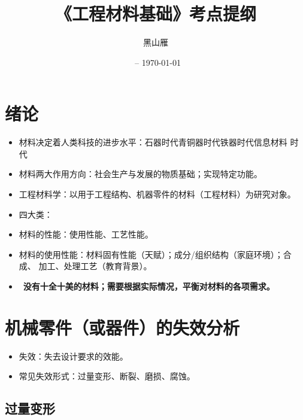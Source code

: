 \documentclass[12pt,a4paper]{article}
\title{《工程材料基础》考点提纲}
\date{\beginday\ -- \today}
\author{黑山雁}
\newcommand{\tightlist}{\setlength{\parskip}{0pt}\setlength{\itemsep}{0pt}}
\newcommand{\hint}[1]{\textsf{（#1）}}
\newcommand{\emphitem}[1]{\item[\faLightbulb]\ \textbf{#1}}
\begin{document}
\maketitle

\section{绪论}
\begin{itemize}\tightlist
  \item 材料决定着人类科技的进步水平：石器时代\to 青铜器时代\to 铁器时代\to 信息材料
  时代
  \item 材料两大作用方向：社会生产与发展的物质基础；实现特定功能。
  \item 工程材料学：以用于工程结构、机器零件的材料\hint{工程材料}为研究对象。
  \item 四大类：
  \item 材料的性能：使用性能、工艺性能。
  \item 材料的使用性能：材料固有性能\hint{天赋}；成分/组织结构\hint{家庭环境}；合成、
  加工、处理工艺\hint{教育背景}。
  \emphitem{没有十全十美的材料；需要根据实际情况，平衡对材料的各项需求。}
\end{itemize}

\section{机械零件（或器件）的失效分析}

\begin{itemize}\tightlist
  \item 失效：失去设计要求的效能。
  \item 常见失效形式：过量变形、断裂、磨损、腐蚀。
\end{itemize}

\subsection{过量变形}
\end{document}
